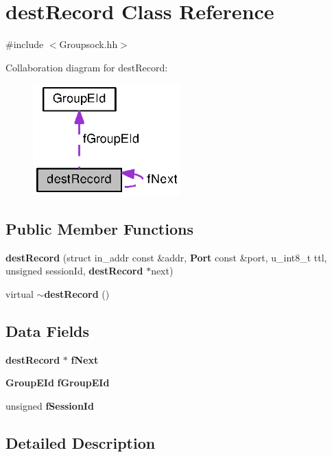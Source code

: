 \section{dest\+Record Class Reference}
\label{classdestRecord}


{\ttfamily \#include $<$Groupsock.\+hh$>$}



Collaboration diagram for dest\+Record\+:
\nopagebreak
\begin{figure}[H]
\begin{center}
\leavevmode
\includegraphics[width=161pt]{classdestRecord__coll__graph}
\end{center}
\end{figure}
\subsection*{Public Member Functions}
\begin{DoxyCompactItemize}
\item 
{\bf dest\+Record} (struct in\+\_\+addr const \&addr, {\bf Port} const \&port, u\+\_\+int8\+\_\+t ttl, unsigned session\+Id, {\bf dest\+Record} $\ast$next)
\item 
virtual {\bf $\sim$dest\+Record} ()
\end{DoxyCompactItemize}
\subsection*{Data Fields}
\begin{DoxyCompactItemize}
\item 
{\bf dest\+Record} $\ast$ {\bf f\+Next}
\item 
{\bf Group\+E\+Id} {\bf f\+Group\+E\+Id}
\item 
unsigned {\bf f\+Session\+Id}
\end{DoxyCompactItemize}


\subsection{Detailed Description}


